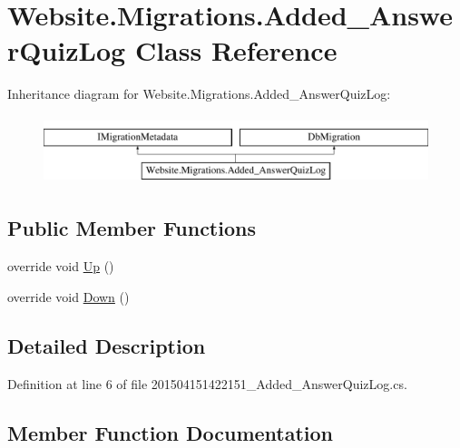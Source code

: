 \hypertarget{class_website_1_1_migrations_1_1_added___answer_quiz_log}{}\section{Website.\+Migrations.\+Added\+\_\+\+Answer\+Quiz\+Log Class Reference}
\label{class_website_1_1_migrations_1_1_added___answer_quiz_log}
Inheritance diagram for Website.\+Migrations.\+Added\+\_\+\+Answer\+Quiz\+Log\+:\begin{figure}[H]
\begin{center}
\leavevmode
\includegraphics[height=2.000000cm]{class_website_1_1_migrations_1_1_added___answer_quiz_log}
\end{center}
\end{figure}
\subsection*{Public Member Functions}
\begin{DoxyCompactItemize}
\item 
override void \hyperlink{class_website_1_1_migrations_1_1_added___answer_quiz_log_a8a1074d827f8980e05dad603b617be3c}{Up} ()
\item 
override void \hyperlink{class_website_1_1_migrations_1_1_added___answer_quiz_log_a2483e3b19b32402d68e316b64e26ae84}{Down} ()
\end{DoxyCompactItemize}


\subsection{Detailed Description}


Definition at line 6 of file 201504151422151\+\_\+\+Added\+\_\+\+Answer\+Quiz\+Log.\+cs.



\subsection{Member Function Documentation}
\hypertarget{class_website_1_1_migrations_1_1_added___answer_quiz_log_a2483e3b19b32402d68e316b64e26ae84}{}

